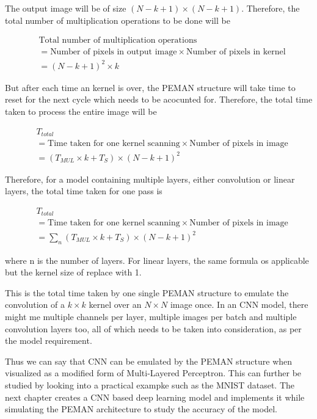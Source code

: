 The output image will be of size $(N - k + 1) \times (N - k + 1)$. Therefore, the total number of multiplication operations to be done will be

\begin{equation}
	\label{eqn:total_mul_ops}
	\begin{split}
		&\text{Total number of multiplication operations} \\
		&= \text{Number of pixels in output image} \times \text{Number of pixels in kernel} \\
		&= (N - k + 1)^2 \times k
	\end{split}
\end{equation}

But after each time an kernel is over, the PEMAN structure will take time to reset for the next cycle which needs to be acocunted for. Therefore, the total time taken to process the entire image will be

\begin{equation}
	\label{eqn:total_time}
	\begin{split}
		&T_{total} \\
		&= \text{Time taken for one kernel scanning} \times \text{Number of pixels in image} \\
		&= (T_{MUL} \times k + T_S) \times (N - k + 1)^2
	\end{split}
\end{equation}

Therefore, for a model containing multiple layers, either convolution or linear layers, the total time taken for one pass is

\begin{equation}
	\label{eqn:total_time_model}
	\begin{split}
		&T_{total} \\
		&= \text{Time taken for one kernel scanning} \times \text{Number of pixels in image} \\
		&= \sum_{n} (T_{MUL} \times k + T_S) \times (N - k + 1)^2
	\end{split}
\end{equation}

where n is the number of layers. For linear layers, the same formula os applicable but the kernel size of replace with 1.

This is the total time taken by one single PEMAN structure to emulate the convolution of a $k \times k$ kernel over an $N  \times N$ image once. In an CNN model, there might me multiple channels per layer, multiple images per batch and multiple convolution layers too, all of which needs to be taken into consideration, as per the model requirement.

Thus we can say that CNN can be emulated by the PEMAN structure when visualized as a modified form of Multi-Layered Perceptron. This can further be studied by looking into a practical exampke such as the MNIST dataset. The next chapter creates a CNN based deep learning model and implements it while simulating the PEMAN architecture to study the accuracy of the model.